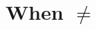 \documentclass{scrreprt}
\begin{document}
\chapter{When \texorpdfstring{$\ne$}{not equal}}
\end{document}
